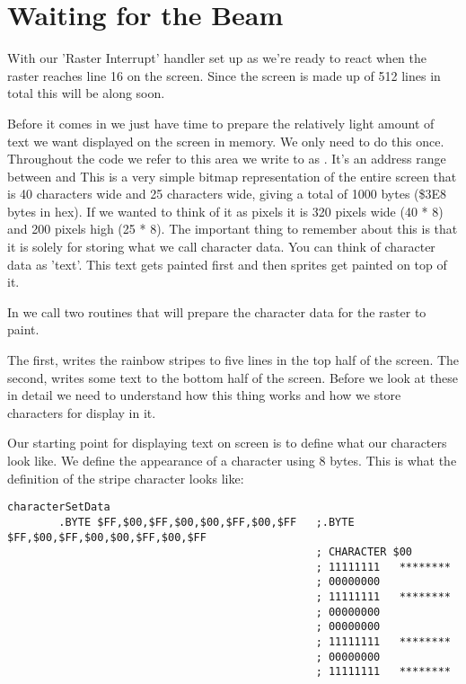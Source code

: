 \section{Waiting for the Beam}
With our 'Raster Interrupt' handler set up as  we're ready to 
react when the raster reaches line 16 on the screen. Since the screen is made up of 512 lines in
total this will be along soon.

Before it comes in we just have time to prepare the relatively light amount of text we want displayed
on the screen in memory. We only need to do this once. Throughout the code we refer to this
area we write to as . It's an address range between  and  This is a very
simple bitmap representation of the entire screen that is 40 characters wide and 25 characters wide,
giving a total of 1000 bytes (\$3E8 bytes in hex). If we wanted to think of it as pixels it is 320 pixels wide (40 * 8)
and 200 pixels high (25 * 8). The important thing to remember about this  is that it is solely
for storing what we call character data. You can think of character data as 'text'. This text gets painted
first and then sprites get painted on top of it.

In  we call two routines that will prepare the character data for the raster to paint. 

The first,  writes the rainbow stripes to five lines in the top half of the screen. 
The second,  writes some text to the bottom half of the screen. Before we look at these
in detail we need to understand how this thing  works and how we store characters for display in it.

Our starting point for displaying text on screen is to define what our characters look like. We define the appearance
of a character using 8 bytes. This is what the definition of the stripe character looks like: 

\begin{lstlisting}[caption= The 'stripe' character.,basicstyle=\tiny]
characterSetData
        .BYTE $FF,$00,$FF,$00,$00,$FF,$00,$FF   ;.BYTE $FF,$00,$FF,$00,$00,$FF,$00,$FF
                                                ; CHARACTER $00
                                                ; 11111111   ********
                                                ; 00000000           
                                                ; 11111111   ********
                                                ; 00000000           
                                                ; 00000000           
                                                ; 11111111   ********
                                                ; 00000000           
                                                ; 11111111   ********
\end{lstlisting}

